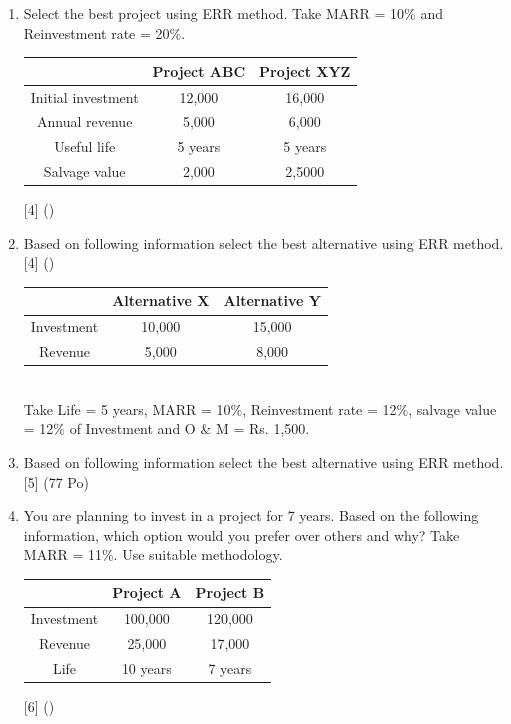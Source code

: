 \documentclass[12pt]{article}
\begin{document}
\begin{enumerate}
		\item Select the best project using ERR method. Take MARR = 10\% and Reinvestment rate = 20\%.\\
		\begin{tabular}{|c|c|c|}
			\hline
			& Project ABC & Project XYZ \\ \hline
			Initial investment & 12,000 & 16,000 \\ \hline
			Annual revenue & 5,000 & 6,000 \\ \hline
			Useful life & 5 years & 5 years \\ \hline
			Salvage value & 2,000 & 2,5000 \\ \hline		
		\end{tabular}  \hfill [4] ()
		
		\item Based on following information select the best alternative using ERR method. \hfill [4] ()\\
		\begin{tabular}{|c|c|c|}
			\hline
			& Alternative X & Alternative Y \\ \hline
			Investment & 10,000 & 15,000 \\ \hline
			Revenue & 5,000 & 8,000 \\ \hline
		\end{tabular}\\
		Take Life = 5 years, MARR = 10\%, Reinvestment rate = 12\%, salvage value = 12\% of Investment and O \& M = Rs. 1,500.

		\item Based on following information select the best alternative using ERR method. \hfill [5] (77 Po)
		
		\item You are planning to invest in a project for 7 years. Based on the following information, which option would you prefer over others and why? Take MARR = 11\%. Use suitable methodology. 
		\begin{tabular}{|c|c|c|}
			\hline
			& Project A & Project B \\ \hline
			Investment & 100,000 & 120,000 \\ \hline
			Revenue & 25,000 & 17,000 \\ \hline
			Life & 10 years & 7 years \\ \hline
		\end{tabular}\hfill [6] ()
		

\end{enumerate}
\end{document}
